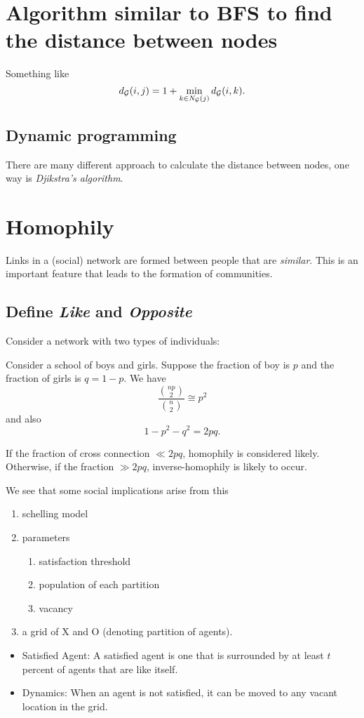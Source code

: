 \section{Algorithm similar to BFS to find the distance between nodes}
Something like
\[
	d_{\mathcal{\MakeUppercase{g}} } (i, j) = 1 + \min_{k\in N_{\mathcal{\MakeUppercase{g}} } (j)} d_{\mathcal{\MakeUppercase{g}} } (i, k).
\]

\subsection{Dynamic programming}
There are many different approach to calculate the distance between nodes, one way is \emph{Djikstra's algorithm}.

\section{Homophily}
Links in a (social) network are formed between people that are \emph{similar}. This is an important feature that leads to
the formation of communities.

\subsection{Define \emph{Like} and \emph{Opposite}}
Consider a network with two types of individuals:
\begin{eg}
	Consider a school of boys and girls. Suppose the fraction of boy is $p$ and the fraction of girls is $q = 1 - p$. We have
	\[
		\frac{\binom{np}{2}}{\binom{n}{2}} \cong p^2
	\]
	and also
	\[
		1 - p^2 - q^2 = 2pq.
	\]

	If the fraction of cross connection $\ll 2pq$, homophily is considered likely. Otherwise, if the fraction $\gg 2pq$, inverse-homophily is likely to occur.
\end{eg}

We see that some social implications arise from this
\begin{enumerate}
	\item schelling model
	\item parameters
	      \begin{enumerate}
		      \item satisfaction threshold
		      \item population of each partition
		      \item vacancy
	      \end{enumerate}
	\item a grid of X and O (denoting partition of agents).
\end{enumerate}

\begin{itemize}
	\item Satisfied Agent: A satisfied agent is one that is surrounded by at least \(t\) percent of agents that are like itself.
	\item Dynamics: When an agent is not satisfied, it can be moved to any vacant location in the grid.
\end{itemize}

